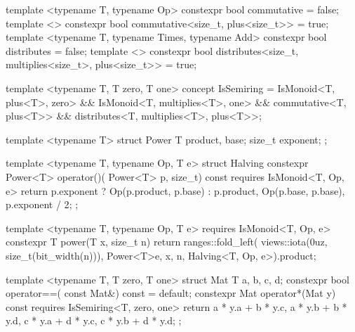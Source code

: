 \begin{listing}[htbp]
\begin{minipage}[t]{0.48\linewidth}
\begin{cpp}
template <typename T, typename Op>
constexpr bool commutative = false;
template <> constexpr bool
commutative<size_t, plus<size_t>> = true;
template <typename T, typename Times,
          typename Add>
constexpr bool distributes = false;
template <> constexpr bool
distributes<size_t, multiplies<size_t>,
            plus<size_t>> = true;
\end{cpp}
\end{minipage}\hfill
\begin{minipage}[t]{0.48\linewidth}
\begin{cpp}
template <typename T, T zero, T one>
concept IsSemiring =
    IsMonoid<T, plus<T>, zero> &&
    IsMonoid<T, multiplies<T>, one> &&
    commutative<T, plus<T>> &&
    distributes<T, multiplies<T>,
                plus<T>>;
\end{cpp}
\end{minipage}

\vspace{2pt}
\noindent\begin{minipage}[t]{0.48\linewidth}
\begin{cpp}
template <typename T>
struct Power { T product, base;
               size_t exponent; };

template <typename T, typename Op, T e>
struct Halving {
  constexpr Power<T> operator()(
      Power<T> p, size_t) const
    requires IsMonoid<T, Op, e> {
    return {
      p.exponent %
          ? Op{}(p.product, p.base) : p.product,
      Op{}(p.base, p.base),
      p.exponent / 2}; } };

template <typename T, typename Op, T e>
  requires IsMonoid<T, Op, e>
constexpr T power(T x, size_t n) {
  return ranges::fold_left(
      views::iota(0uz, size_t(bit_width(n))),
      Power<T>{e, x, n},
      Halving<T, Op, e>{}).product; }
\end{cpp}
\end{minipage}\hfill
\begin{minipage}[t]{0.48\linewidth}
\begin{cpp}
template <typename T, T zero, T one>
struct Mat { T a, b, c, d;
  constexpr bool operator==(
      const Mat&) const = default;
  constexpr Mat operator*(Mat y) const
    requires IsSemiring<T, zero, one> {
    return {
      a * y.a + b * y.c, a * y.b + b * y.d,
      c * y.a + d * y.c, c * y.b + d * y.d}; } };


\end{cpp}
\end{minipage}
\end{listing}
